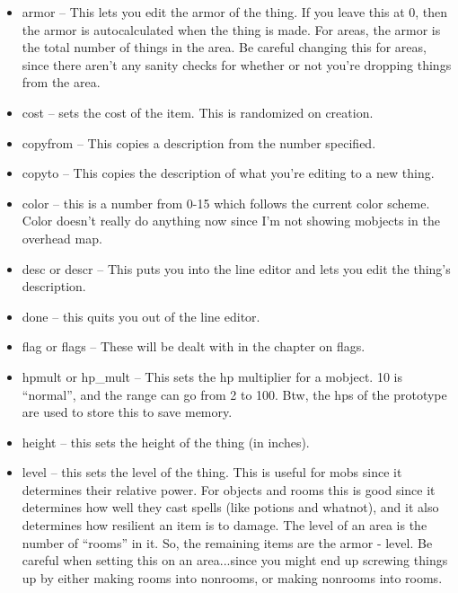\begin{itemize}

\item armor -- This lets you edit the armor of the thing. If you leave this at 0, then the armor is autocalculated when the thing is made. For areas, the armor is the total number of things in the area. Be careful changing this for areas, since there aren't any sanity checks for whether or not you're dropping things from the area.

\item cost -- sets the cost of the item. This is randomized on creation.

\item copyfrom -- This copies a description from the number specified.

\item copyto -- This copies the description of what you're editing to a new thing.

\item color -- this is a number from 0-15 which follows the current color scheme. Color doesn't really do anything now since I'm not showing mobjects in the overhead map.

\item desc or descr -- This puts you into the line editor and lets you edit the thing's description.

\item done -- this quits you out of the line editor.

\item flag or flags -- These will be dealt with in the chapter on flags.

\item hpmult or hp\_mult -- This sets the hp multiplier for a mobject. 10 is ``normal'', and the range can go from 2 to 100. Btw, the hps of the prototype are used to store this to save memory.

\item height -- this sets the height of the thing (in inches).

\item level -- this sets the level of the thing. This is useful for mobs since it determines their relative power. For objects and rooms this is good since it determines how well they cast spells (like potions and whatnot), and it also determines how resilient an item is to damage. The level of an area is the number of ``rooms'' in it. So, the remaining items are the armor - level. Be careful when setting this on an area...since you might end up screwing things up by either making rooms into nonrooms, or making nonrooms into rooms.


\end{itemize}
